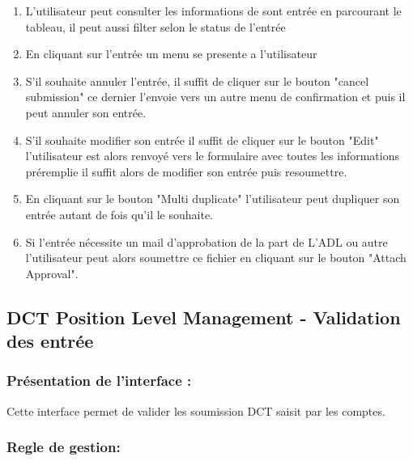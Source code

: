 \begin{enumerate}
    
    \item L'utilisateur peut consulter les informations de sont entrée en parcourant le tableau, il peut aussi filter selon le status de l'entrée
    \vspace{0.1cm}
    \item En cliquant sur l'entrée un menu se presente a l'utilisateur
    \vspace{0.1cm}
    \item S’il souhaite annuler l'entrée, il suffit de cliquer sur le bouton "cancel submission" ce dernier l'envoie vers un autre menu de confirmation et puis il peut annuler son entrée.
    \vspace{0.1cm}
    \item S’il souhaite modifier son entrée il suffit de cliquer sur le bouton "Edit" l'utilisateur est alors renvoyé vers le formulaire avec toutes les informations préremplie il suffit alors de modifier son entrée puis resoumettre.
    \vspace{0.1cm}
    \item En cliquant sur le bouton "Multi duplicate" l'utilisateur peut dupliquer son entrée autant de fois qu'il le souhaite.
    \vspace{0.1cm}
    \item Si l'entrée nécessite un mail d'approbation de la part de L'ADL ou autre l'utilisateur peut alors soumettre ce fichier en cliquant sur le bouton "Attach Approval".

\end{enumerate}


\subsection{DCT Position Level Management - Validation des entrée}

\subsubsection{Présentation de l'interface :}

Cette interface permet de valider les soumission DCT saisit par les comptes.

\subsubsection{Regle de gestion:}

